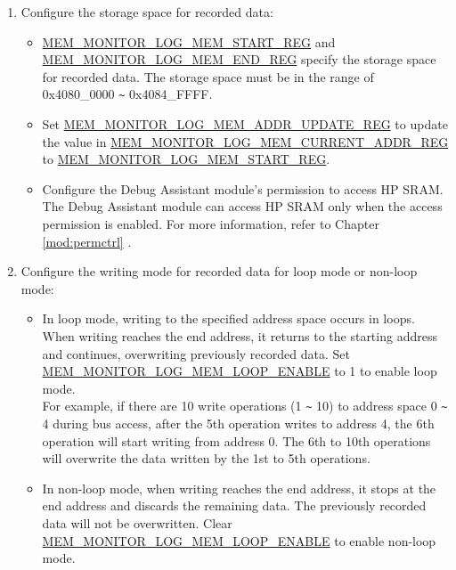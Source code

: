 \documentclass[main\_\_EN.tex]{subfiles}
\begin{document}
\begin{enumerate}
\begin{itemize}
        \end{itemize}
    \item Configure the storage space for recorded data:
        \begin{itemize}
            \item \hyperref[regdesc:MEMMONITORLOGMEMSTARTREG]{MEM\_MONITOR\_LOG\_MEM\_START\_REG} and \hyperref[regdesc:MEMMONITORLOGMEMENDREG]{MEM\_MONITOR\_LOG\_MEM\_END\_REG} specify the storage space for recorded data. The storage space must be in the range of 0x4080\_0000 \verb+~+ 0x4084\_FFFF.
            \item Set \hyperref[regdesc:MEMMONITORLOGMEMADDRUPDATEREG]{MEM\_MONITOR\_LOG\_MEM\_ADDR\_UPDATE\_REG} to update the value in \hyperref[regdesc:MEMMONITORLOGMEMCURRENTADDRREG]{MEM\_MONITOR\_LOG\_MEM\_CURRENT\_ADDR\_REG} to \hyperref[regdesc:MEMMONITORLOGMEMSTARTREG]{MEM\_MONITOR\_LOG\_MEM\_START\_REG}.
            \item Configure the Debug Assistant module's permission to access HP SRAM. The Debug Assistant module can access HP SRAM only when the access permission is enabled. For more information, refer to Chapter \ref{mod:permctrl} \textit{}.
        \end{itemize}
    \item \label{other:dbgassist-item-log-config-step5} Configure the writing mode for recorded data for loop mode or non-loop mode:
        \begin{itemize}
            \item In loop mode, writing to the specified address space occurs in loops. When writing reaches the end address, it returns to the starting address and continues, overwriting previously recorded data. Set \hyperref[fielddesc:MEMMONITORLOGMEMLOOPENABLE]{MEM\_MONITOR\_LOG\_MEM\_LOOP\_ENABLE} to 1 to enable loop mode.\\
            For example, if there are 10 write operations (1 \verb+~+ 10) to address space 0 \verb+~+ 4 during bus access, after the 5th operation writes to address 4, the 6th operation will start writing from address 0. The 6th to 10th operations will overwrite the data written by the 1st to 5th operations.
            \item In non-loop mode, when writing reaches the end address, it stops at the end address and discards the remaining data. The previously recorded data will not be overwritten. Clear \hyperref[fielddesc:MEMMONITORLOGMEMLOOPENABLE]{MEM\_MONITOR\_LOG\_MEM\_LOOP\_ENABLE} to enable non-loop mode.\\

\end{itemize}
\end{enumerate}
\end{document}
